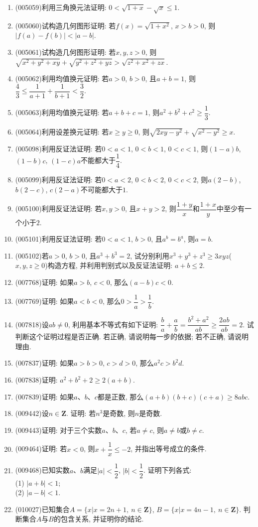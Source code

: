 \documentclass[10pt,a4paper]{article}
\begin{document}
\begin{enumerate}[1.]
\item {\tiny (005059)}利用三角换元法证明: $0<\sqrt{1+x}-\sqrt x\le 1$.
\item {\tiny (005060)}试构造几何图形证明: 若$f(x)=\sqrt{1+x^2}$, $x>b>0$, 则$|f(a)-f(b)|<|a-b|$.
\item {\tiny (005061)}试构造几何图形证明: 若$x,y,z>0$, 则$\sqrt{x^2+y^2+xy}+\sqrt{y^2+z^2+yz}>\sqrt{z^2+x^2+zx}$.
\item {\tiny (005062)}利用均值换元证明: 若$a>0$, $b>0$, 且$a+b=1$, 则$\dfrac 43\le \dfrac 1{a+1}+\dfrac 1{b+1}<\dfrac 32$.
\item {\tiny (005063)}利用均值换元证明: 若$a+b+c=1$, 则${a^2}+{b^2}+{c^2}\ge \dfrac 13$.
\item {\tiny (005064)}利用设差换元证明: 若$x\ge y\ge 0$, 则$\sqrt{2xy-{y^2}}+\sqrt{x^2-y^2}\ge x$.
\item {\tiny (005098)}利用反证法证明: 若$0<a<1$, $0<b<1$, $0<c<1$, 则$(1-a)b$, $(1-b)c$, $(1-c)a$不能都大于$\dfrac 14$.
\item {\tiny (005099)}利用反证法证明: 若$0<a<2$, $0<b<2$, $0<c<2$, 则$a(2-b)$, $b(2-c)$, $c(2-a)$不可能都大于$1$.
\item {\tiny (005100)}利用反证法证明: 若$x,y>0$, 且$x+y>2$, 则$\dfrac{1+y}x$和$\dfrac{1+x}y$中至少有一个小于$2$.
\item {\tiny (005101)}利用反证法证明: 若$0<a<1$, $b>0$, 且$a^b=b^a$, 则$a=b$.
\item {\tiny (005102)}若$a>0$, $b>0$, 且$a^3+b^3=2$, 试分别利用$x^3+y^3+z^3\ge 3xyz$($x,y,z\ge 0$)构造方程, 并利用判别式以及反证法证明: $a+b\le 2$.
\item {\tiny (007768)}证明: 如果$a>b$, $c<0$, 那么$(a-b)c<0$.
\item {\tiny (007769)}证明: 如果$a<b<0$, 那么$0>\dfrac 1a>\dfrac 1b$.
\item {\tiny (007818)}设$ab\ne 0$, 利用基本不等式有如下证明: $\dfrac ba+\dfrac ab=\dfrac{{b^2}+{a^2}}{ab}\ge \dfrac{2ab}{ab}=2$. 试判断这个证明过程是否正确. 若正确, 请说明每一步的依据; 若不正确, 请说明理由.
\item {\tiny (007837)}证明: 如果$a>b>0$, $c>d>0$, 那么$a^2c>b^2d$.
\item {\tiny (007838)}证明: $a^2+b^2+2\ge 2(a+b)$.
\item {\tiny (007839)}证明: 如果$a$、$b$、$c$都是正数, 那么$(a+b)(b+c)(c+a)\ge 8abc$.
\item {\tiny (009442)}设$n\in \mathbf{Z}$. 证明: 若$n^3$是奇数, 则$n$是奇数.
\item {\tiny (009443)}证明: 对于三个实数$a$、$b$、$c$, 若$a\ne c$, 则$a\ne b$或$b\ne c$.
\item {\tiny (009464)}证明: 若$x<0$, 则$x+\dfrac 1x\le -2$, 并指出等号成立的条件.
\item {\tiny (009468)}已知实数$a$、$b$满足$|a| <\dfrac 12$, $|b| <\dfrac 12$. 证明下列各式:\\
(1) $|a+b| <1$;\\
(2) $|a-b| <1$.
\item {\tiny (010027)}已知集合$A=\{x|x=2n+1,\ n\in \mathbf{Z}\}$, $B=\{x|x=4n-1,\ n\in \mathbf{Z}\}$. 判断集合$A$与$B$的包含关系, 并证明你的结论.


\end{enumerate}
\end{document}
